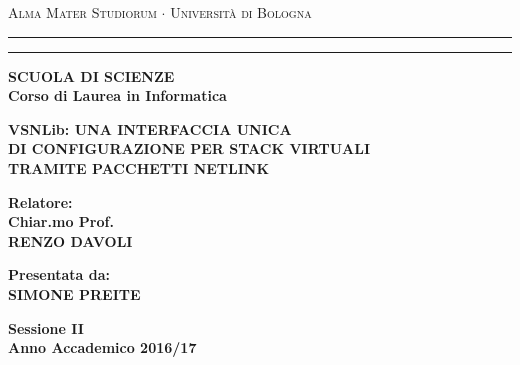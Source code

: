 \documentclass[12pt,a4paper]{report}
\begin{document}
\begin{titlepage}
\begin{center}
{{\Large{\textsc{Alma Mater Studiorum $\cdot$ Universit\`a di
Bologna}}}} \rule[0.1cm]{15.8cm}{0.1mm}
\rule[0.5cm]{15.8cm}{0.6mm}
{\bf SCUOLA DI SCIENZE\\
Corso di Laurea in Informatica }
\end{center}
\vspace{35mm}
\begin{center}
{\Large{\bf VSNLib: UNA INTERFACCIA UNICA }}\\
\vspace{3mm}
{\Large{\bf DI CONFIGURAZIONE PER STACK VIRTUALI }}\\
\vspace{3mm}
{\Large{\bf TRAMITE PACCHETTI NETLINK}}\\
\end{center}
\vspace{40mm}
\par
\noindent
\begin{minipage}[t]{0.47\textwidth}
{\large{\bf Relatore:\\
Chiar.mo Prof.\\
RENZO DAVOLI}}\\
\end{minipage}
\hfill
\begin{minipage}[t]{0.47\textwidth}\raggedleft
{\large{\bf Presentata da:\\
SIMONE PREITE}}
\end{minipage}
\vspace{40mm}
\begin{center}
{\large{\bf Sessione II\\%
Anno Accademico 2016/17}}%
\end{center}
\end{titlepage}
\end{document}
